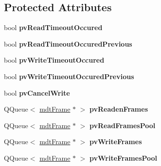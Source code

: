 \subsection*{Protected Attributes}
\begin{DoxyCompactItemize}
\item 
\hypertarget{classmdt_abstract_port_a9faa5966fcf4232b3d25034c0f67dd7c}{
bool {\bfseries pvReadTimeoutOccured}}
\label{classmdt_abstract_port_a9faa5966fcf4232b3d25034c0f67dd7c}

\item 
\hypertarget{classmdt_abstract_port_a2530e291d5ae4c1584595f9a5df7e9ff}{
bool {\bfseries pvReadTimeoutOccuredPrevious}}
\label{classmdt_abstract_port_a2530e291d5ae4c1584595f9a5df7e9ff}

\item 
\hypertarget{classmdt_abstract_port_ae5a003d280237700c8aa3cb6184e2d1b}{
bool {\bfseries pvWriteTimeoutOccured}}
\label{classmdt_abstract_port_ae5a003d280237700c8aa3cb6184e2d1b}

\item 
\hypertarget{classmdt_abstract_port_a8b65c0e26dc13147f02571ba74bef539}{
bool {\bfseries pvWriteTimeoutOccuredPrevious}}
\label{classmdt_abstract_port_a8b65c0e26dc13147f02571ba74bef539}

\item 
\hypertarget{classmdt_abstract_port_a402cdf97259c6872bb1b6142d784c047}{
bool {\bfseries pvCancelWrite}}
\label{classmdt_abstract_port_a402cdf97259c6872bb1b6142d784c047}

\item 
\hypertarget{classmdt_abstract_port_a412c3e4903bf7d90914cfeb273e82623}{
QQueue$<$ \hyperlink{classmdt_frame}{mdtFrame} $\ast$ $>$ {\bfseries pvReadenFrames}}
\label{classmdt_abstract_port_a412c3e4903bf7d90914cfeb273e82623}

\item 
\hypertarget{classmdt_abstract_port_a3d6bb9b420f64776d8fd077cf2b9b873}{
QQueue$<$ \hyperlink{classmdt_frame}{mdtFrame} $\ast$ $>$ {\bfseries pvReadFramesPool}}
\label{classmdt_abstract_port_a3d6bb9b420f64776d8fd077cf2b9b873}

\item 
\hypertarget{classmdt_abstract_port_a12cd5c1ba100b018539ed909a481d6dc}{
QQueue$<$ \hyperlink{classmdt_frame}{mdtFrame} $\ast$ $>$ {\bfseries pvWriteFrames}}
\label{classmdt_abstract_port_a12cd5c1ba100b018539ed909a481d6dc}

\item 
\hypertarget{classmdt_abstract_port_a67a8b1965f20a55ad115926aed0234b4}{
QQueue$<$ \hyperlink{classmdt_frame}{mdtFrame} $\ast$ $>$ {\bfseries pvWriteFramesPool}}
\label{classmdt_abstract_port_a67a8b1965f20a55ad115926aed0234b4}


\end{DoxyCompactItemize}
